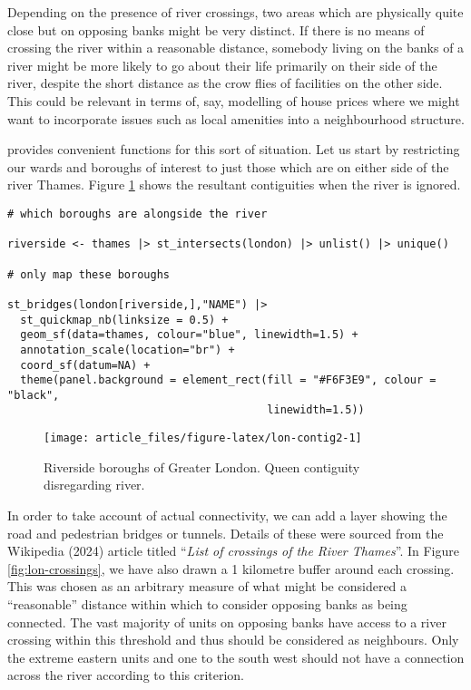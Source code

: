 Depending on the presence of river crossings, two areas which are physically quite close but on opposing banks might be very distinct. If there is no means of crossing the river within a reasonable distance, somebody living on the banks of a river might be more likely to go about their life primarily on their side of the river, despite the short distance as the crow flies of facilities on the other side. This could be relevant in terms of, say, modelling of house prices where we might want to incorporate issues such as local amenities into a neighbourhood structure.

 provides convenient functions for this sort of situation. Let us start by restricting our wards and boroughs of interest to just those which are on either side of the river Thames. Figure \ref{fig:lon-contig2} shows the resultant contiguities when the river is ignored.

\begin{verbatim}
# which boroughs are alongside the river

riverside <- thames |> st_intersects(london) |> unlist() |> unique()

# only map these boroughs

st_bridges(london[riverside,],"NAME") |> 
  st_quickmap_nb(linksize = 0.5) +
  geom_sf(data=thames, colour="blue", linewidth=1.5) + 
  annotation_scale(location="br") +
  coord_sf(datum=NA) + 
  theme(panel.background = element_rect(fill = "#F6F3E9", colour = "black", 
                                        linewidth=1.5))
\end{verbatim}

\begin{figure}

{\centering \texttt{[image: article\_files/figure-latex/lon-contig2-1]} 

}

\caption{Riverside boroughs of Greater London. Queen contiguity disregarding river. }\label{fig:lon-contig2}
\end{figure}

In order to take account of actual connectivity, we can add a layer showing the road and pedestrian bridges or tunnels. Details of these were sourced from the Wikipedia (2024) article titled ``\emph{List of crossings of the River Thames}''. In Figure \ref{fig:lon-crossings}, we have also drawn a 1 kilometre buffer around each crossing. This was chosen as an arbitrary measure of what might be considered a ``reasonable'' distance within which to consider opposing banks as being connected. The vast majority of units on opposing banks have access to a river crossing within this threshold and thus should be considered as neighbours. Only the extreme eastern units and one to the south west should not have a connection across the river according to this criterion.

